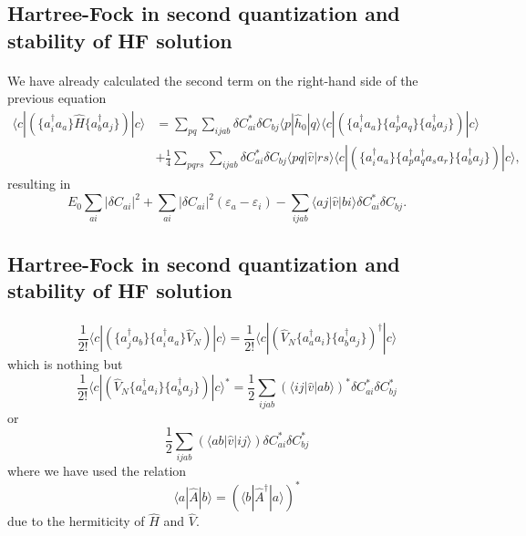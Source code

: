 \documentclass[%
twoside,                 %
final,                   %
10pt]{article}
\begin{document}
\subsection*{Hartree-Fock in second quantization and stability of HF solution}

\paragraph{}
We have already calculated the second term on the right-hand side of the previous equation
\begin{align}
\langle c | \left(\{a^\dagger_i a_a\} \hat{H} \{a^\dagger_b a_j\} \right) | c\rangle&=\sum_{pq} \sum_{ijab}\delta C_{ai}^*\delta C_{bj} \langle p|\hat{h}_0 |q\rangle 
            \langle c | \left(\{a^{\dagger}_i a_a\}\{a^{\dagger}_pa_q\} 
             \{a^{\dagger}_b a_j\} \right)| c\rangle\\
& +\frac{1}{4} \sum_{pqrs} \sum_{ijab}\delta C_{ai}^*\delta C_{bj} \langle pq| \hat{v}|rs\rangle 
            \langle c | \left(\{a^\dagger_i a_a\}\{a^{\dagger}_p a^{\dagger}_q a_s  a_r\} \{a^{\dagger}_b a_j\} \right)| c\rangle ,
\end{align}
resulting in
\[
E_0\sum_{ai}|\delta C_{ai}|^2+\sum_{ai}|\delta C_{ai}|^2(\varepsilon_a-\varepsilon_i)-\sum_{ijab} \langle aj|\hat{v}| bi\rangle \delta C_{ai}^*\delta C_{bj}.
\]



\subsection*{Hartree-Fock in second quantization and stability of HF solution}

\paragraph{}
\[
\frac{1}{2!}\langle c |\left(\{a^\dagger_j a_b\} \{a^\dagger_i a_a\} \hat{V}_N  \right) | c\rangle  = 
\frac{1}{2!}\langle c |\left( \hat{V}_N \{a^\dagger_a a_i\} \{a^\dagger_b a_j\} \right)^{\dagger} | c\rangle 
\]
which is nothing but
\[
\frac{1}{2!}\langle c |  \left( \hat{V}_N \{a^\dagger_a a_i\} \{a^\dagger_b a_j\} \right) | c\rangle^*
=\frac{1}{2} \sum_{ijab} (\langle ij|\hat{v}|ab\rangle)^*\delta C_{ai}^*\delta C_{bj}^*
\]
or 
\[
\frac{1}{2} \sum_{ijab} (\langle ab|\hat{v}|ij\rangle)\delta C_{ai}^*\delta C_{bj}^*
\]
where we have used the relation
\[ 
\langle a |\hat{A} | b\rangle =  (\langle b |\hat{A}^{\dagger} | a\rangle)^*
\]
due to the hermiticity of $\hat{H}$ and $\hat{V}$.
\end{document}
